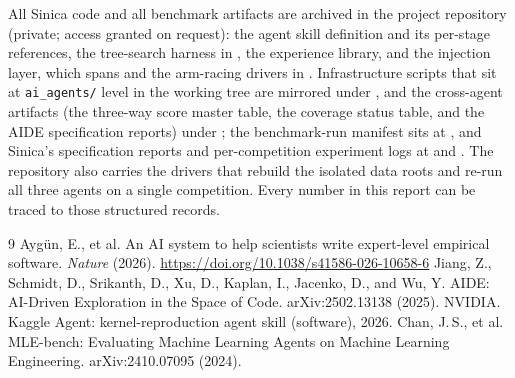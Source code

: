 \documentclass[11pt,a4paper]{article}
\begin{document}
All Sinica code and all benchmark artifacts are archived in the project repository \href{https://github.com/930731haohao-afk/kaggle-agent}{} (private; access granted on request): the agent skill definition and its per-stage references, the tree-search harness in , the experience library, and the injection layer, which spans  and the arm-racing drivers in . Infrastructure scripts that sit at \texttt{ai\_agents/} level in the working tree are mirrored under \href{https://github.com/930731haohao-afk/kaggle-agent/tree/main/benchmark_infra}{}, and the cross-agent artifacts (the three-way score master table, the coverage status table, and the AIDE specification reports) under \href{https://github.com/930731haohao-afk/kaggle-agent/tree/main/benchmark_results}{}; the benchmark-run manifest sits at , and Sinica's specification reports and per-competition experiment logs at  and . The repository also carries the drivers that rebuild the isolated data roots and re-run all three agents on a single competition. Every number in this report can be traced to those structured records.


\begin{thebibliography}{9}
 Ayg\"un, E., et al. An AI system to help scientists write expert-level empirical software. \emph{Nature} (2026). \url{https://doi.org/10.1038/s41586-026-10658-6}
 Jiang, Z., Schmidt, D., Srikanth, D., Xu, D., Kaplan, I., Jacenko, D., and Wu, Y. AIDE: AI-Driven Exploration in the Space of Code. arXiv:2502.13138 (2025).
 NVIDIA. Kaggle Agent: kernel-reproduction agent skill (software), 2026.
 Chan, J.\,S., et al. MLE-bench: Evaluating Machine Learning Agents on Machine Learning Engineering. arXiv:2410.07095 (2024).
\end{thebibliography}
\end{document}
